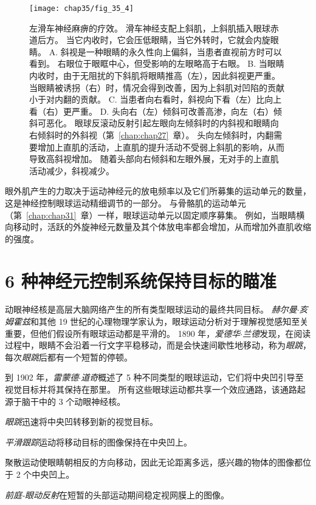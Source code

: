 \begin{figure}[htbp]
	\centering
	\texttt{[image: chap35/fig\_35\_4]}
	\caption{左滑车神经麻痹的疗效。
		滑车神经支配上斜肌，上斜肌插入眼球赤道后方。
		当它内收时，它会压低眼睛，当它外转时，它就会内旋眼睛。
		A. 斜视是一种眼睛的永久性向上偏斜，当患者直视前方时可以看到。
		右眼位于眼眶中心，但受影响的左眼略高于右眼。
		B. 当眼睛内收时，由于无阻扰的下斜肌将眼睛推高（左），因此斜视更严重。
		当眼睛被诱拐（右）时，情况会得到改善，因为上斜肌对凹陷的贡献小于对内翻的贡献。
		C. 当患者向右看时，斜视向下看（左）比向上看（右）更严重。
		D. 头向右（左）倾斜可改善高渗，向左（右）倾斜可恶化。
		眼球反滚动反射引起左眼向左倾斜时的内斜视和眼睛向右倾斜时的外斜视（第~\ref{chap:chap27}~章）。
		头向左倾斜时，内翻需要增加上直肌的活动，上直肌的提升活动不受弱上斜肌的影响，从而导致高斜视增加。
		随着头部向右倾斜和左眼外展，无对手的上直肌活动减少，斜视减少。}
	\label{fig:35_4}
\end{figure}


眼外肌产生的力取决于运动神经元的放电频率以及它们所募集的运动单元的数量，这是神经控制眼球运动精细调节的一部分。
与骨骼肌的运动单元（第~\ref{chap:chap31}~章）一样，眼球运动单元以固定顺序募集。
例如，当眼睛横向移动时，活跃的外旋神经元数量及其个体放电率都会增加，从而增加外直肌收缩的强度。



\section{6 种神经元控制系统保持目标的瞄准}

动眼神经核是高层大脑网络产生的所有类型眼球运动的最终共同目标。
\textit{赫尔曼$\cdot$亥姆霍兹}和其他 19 世纪的心理物理学家认为，眼球运动分析对于理解视觉感知至关重要，但他们假设所有眼球运动都是平滑的。
1890 年，\textit{爱德华$\cdot$兰德}发现，在阅读过程中，眼睛不会沿着一行文字平稳移动，而是会快速间歇性地移动，称为\textit{眼跳}，每次\textit{眼跳}后都有一个短暂的停顿。


到 1902 年，\textit{雷蒙德$\cdot$道奇}概述了 5 种不同类型的眼球运动，它们将中央凹引导至视觉目标并将其保持在那里。
所有这些眼球运动都共享一个效应通路，该通路起源于脑干中的 3 个动眼神经核。


\textit{眼跳}迅速将中央凹转移到新的视觉目标。


\textit{平滑跟踪}运动将移动目标的图像保持在中央凹上。


聚散运动使眼睛朝相反的方向移动，因此无论距离多远，感兴趣的物体的图像都位于 2 个中央凹上。


\textit{前庭-眼动反射}在短暂的头部运动期间稳定视网膜上的图像。


